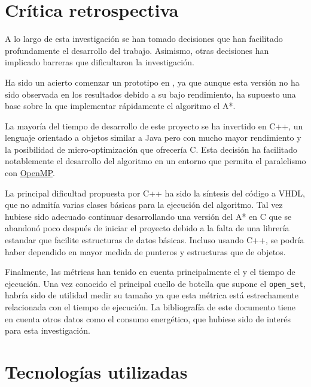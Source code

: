 \pagebreak
\section{Crítica retrospectiva}

A lo largo de esta investigación se han tomado decisiones que han facilitado profundamente
el desarrollo del trabajo.
Asimismo, otras decisiones han implicado barreras que dificultaron la investigación.

Ha sido un acierto comenzar un prototipo en \Python{},
ya que aunque esta versión no ha sido observada en los resultados
debido a su bajo rendimiento,
ha supuesto una base sobre la que implementar rápidamente
el algoritmo el A*.

La mayoría del tiempo de desarrollo de este proyecto se ha invertido
en C++, un lenguaje orientado a objetos similar a Java pero con mucho mayor rendimiento
y la posibilidad de micro-optimización que ofrecería C.
Esta decisión ha facilitado notablemente el desarrollo del algoritmo
en un entorno que permita el paralelismo con 
\href{https://www.openmp.org/}{OpenMP}\@.

La principal dificultad propuesta por C++ ha sido la síntesis del código
a VHDL, que no admitía varias clases básicas para la ejecución del algoritmo.
Tal vez hubiese sido adecuado continuar desarrollando una versión del A*
en C que se abandonó poco después de iniciar el proyecto
debido a la falta de una librería estandar que facilite
estructuras de datos básicas.
Incluso usando C++, se podría haber dependido
en mayor medida de punteros y estructuras que de objetos.

Finalmente, las métricas han tenido en cuenta principalmente el 
y el tiempo de ejecución.
Una vez conocido el principal cuello de botella que supone el \lstinline{open_set},
habría sido de utilidad medir su tamaño ya que esta métrica está
estrechamente relacionada con el tiempo de ejecución.
La bibliografía de este documento tiene en cuenta otros datos como el consumo energético,
que hubiese sido de interés para esta investigación.

\pagebreak
\section{Tecnologías utilizadas}
\label{sec:TecnologiasUtilizadas}

